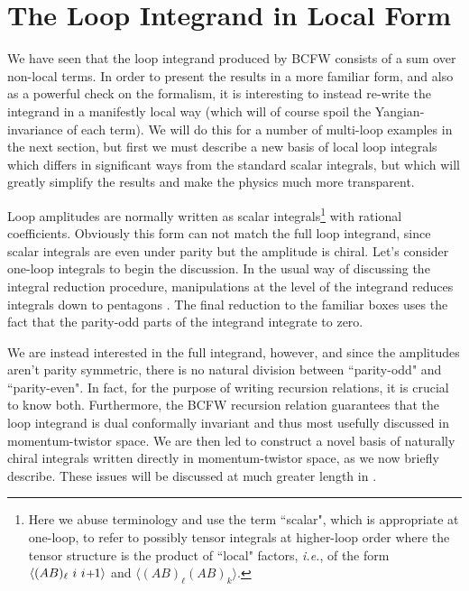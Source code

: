 \documentclass[11pt, reqno]{article}
\newcommand{\smallplus}{\hspace{0.5pt}\text{{\small+}}\hspace{-0.5pt}}
\begin{document}
\section{The Loop Integrand in Local Form}\label{local_loop_integrands}

We have seen that the loop integrand produced by BCFW consists of a sum over non-local terms. In order to present the results in a more familiar form, and also as a powerful check on the formalism, it is interesting to instead re-write the integrand in a manifestly local way (which will of course spoil the Yangian-invariance of each term). We will do this for a number of multi-loop examples in the next section, but first we must describe a new basis of local loop integrals which differs in significant ways from the standard scalar integrals, but which will greatly simplify the results and make the physics much more transparent.

Loop amplitudes are normally written as scalar integrals\footnote{Here we abuse terminology and use the term ``scalar", which is appropriate at one-loop, to refer to possibly tensor integrals at higher-loop order where the tensor structure is the product of ``local" factors, {\it i.e.}, of the form $\langle (AB)_{\ell}\,\,i\,\,i\smallplus1\rangle$ and $\langle (AB)_{\ell} (AB)_{k}\rangle$.} with rational coefficients. Obviously this form can not match the full loop integrand, since scalar integrals are even under parity but the amplitude is chiral. Let's consider one-loop integrals to begin the discussion. In the usual way of discussing the integral reduction procedure, manipulations at the level of the integrand reduces integrals down to pentagons \cite{vanNeerven:1983vr}. The final reduction to the familiar boxes uses the fact that the parity-odd parts of the integrand integrate to zero.

We are instead interested in the full integrand, however, and since the amplitudes aren't parity symmetric, there is no natural division between ``parity-odd" and ``parity-even". In fact,
for the purpose of writing recursion relations, it is crucial to know both. Furthermore, the BCFW recursion relation guarantees that the loop integrand is dual conformally invariant and thus most usefully discussed in momentum-twistor space. We are then led to construct a novel basis of naturally chiral integrals written directly in momentum-twistor space, as we now briefly describe. These issues will be discussed at much greater length in \cite{InPrep}.
\end{document}
